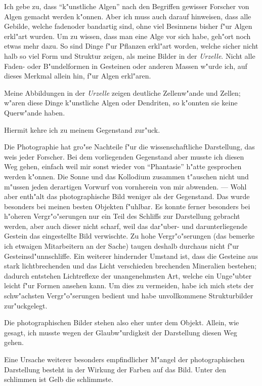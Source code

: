 \documentclass[a4paper, 11pt, oneside]{article}
\begin{document}
Ich gebe zu, dass "`k"unstliche Algen"' nach den Begriffen gewisser Forscher von Algen gemacht werden k"onnen. Aber ich muss auch darauf hinweisen, dass alle Gebilde, welche fadenoder bandartig sind, ohne viel Besinnens bisher f"ur Algen erkl"art wurden. Um zu wissen, dass man eine Alge vor sich habe, geh"ort noch etwas mehr dazu. So sind Dinge f"ur Pflanzen erkl"art worden, welche sicher nicht halb so viel Form und Struktur zeigen, als meine Bilder in der \emph{Urzelle}. Nicht alle Faden- oder B"undelformen in Gesteinen oder anderen Massen w"urde ich, auf dieses Merkmal allein hin, f"ur Algen erkl"aren.

Meine Abbildungen in der \emph{Urzelle} zeigen deutliche Zellenw"ande und Zellen; w"aren diese Dinge k"unstliche Algen oder Dendriten, so k"onnten sie keine Querw"ande haben.

Hiermit kehre ich zu meinem Gegenstand zur"uck.

Die Photographie hat gro"se Nachteile f"ur die wissenschaftliche Darstellung, das weis jeder Forscher. Bei dem vorliegenden Gegenstand aber musste ich diesen Weg gehen, einfach weil mir sonst wieder von "`Phantasie"' h"atte gesprochen werden k"onnen. Die Sonne und das Kollodium zusammen t"auschen nicht und m"ussen jeden derartigen Vorwurf von vornherein von mir abwenden. --- Wohl aber enth"alt das photographische Bild weniger als der Gegenstand. Das wurde besonders bei meinen besten Objekten f"uhlbar. Es konnte ferner besonders bei h"oheren Vergr"o"serungen nur ein Teil des Schliffs zur Darstellung gebracht werden, aber auch dieser nicht scharf, weil das dar"uber- und darunterliegende Gestein das eingestellte Bild verwischte. Zu hohe Vergr"o"serungen (das bemerke ich etwaigen Mitarbeitern an der Sache) taugen deshalb durchaus nicht f"ur Gesteinsd"unnschliffe. Ein weiterer hindernder Umstand ist, dass die Gesteine aus stark lichtbrechenden und das Licht verschieden brechenden Mineralien bestehen; dadurch entstehen Lichtreflexe der unangenehmsten Art, welche ein Unge"ubter leicht f"ur Formen ansehen kann. Um dies zu vermeiden, habe ich mich stets der schw"achsten Vergr"o"serungen bedient und habe unvollkommene Strukturbilder zur"uckgelegt.

Die photographischen Bilder stehen also eher unter dem Objekt. Allein, wie gesagt, ich musste wegen der Glaubw"urdigkeit der Darstellung diesen Weg gehen.

Eine Ursache weiterer besonders empfindlicher M"angel der photographischen Darstellung besteht in der Wirkung der Farben auf das Bild. Unter den schlimmen ist Gelb die schlimmste.
\end{document}
